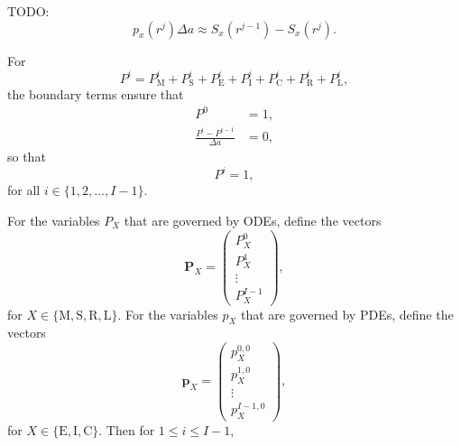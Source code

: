 \documentclass[12pt]{article}
\renewcommand{\vec}[1]{\mathbf{#1}}
\begin{document}
TODO: $$p_x(r^j) \Delta a \approx S_x(r^{j - 1}) - S_x(r^j).$$

For
\begin{equation}
  P^i = P_{\mathrm{M}}^i + P_{\mathrm{S}}^i + P_{\mathrm{E}}^i
  + P_{\mathrm{I}}^i + P_{\mathrm{C}}^i + P_{\mathrm{R}}^i
  + P_{\mathrm{L}}^i,
\end{equation}
the boundary terms ensure that
\begin{align}
  P^0 &= 1,
  \\
  \frac{P^i - P^{i - 1}}{\Delta a} &= 0,
\end{align}
so that
\begin{equation}
  P^i = 1,
\end{equation}
for all $i \in \{1, 2, \ldots, I - 1\}$.

For the variables $P_X$ that are governed by ODEs,
define the vectors
\begin{equation}
  \vec{P}_X =
  \begin{pmatrix}
    P_X^0\\
    P_X^1\\
    \vdots\\
    P_X^{I - 1}
  \end{pmatrix},
\end{equation}
for $X \in \{\mathrm{M}, \mathrm{S}, \mathrm{R}, \mathrm{L}\}$.
For the variables $p_X$ that are governed by PDEs,
define the vectors
\begin{equation}
  \vec{p}_X =
  \begin{pmatrix}
    p_X^{0, 0}\\
    p_X^{1, 0}\\
    \vdots\\
    p_X^{I - 1, 0}
  \end{pmatrix},
\end{equation}
for $X \in \{\mathrm{E}, \mathrm{I}, \mathrm{C}\}$.
Then for $1 \leq i \leq I - 1$,
\end{document}
